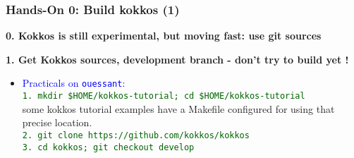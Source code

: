 \begin{frame}
  \frametitle{Hands-On 0: Build kokkos (1)}
  
  \textbf{0. Kokkos is still experimental, but moving fast: use git sources}
  
  \textbf{1. Get Kokkos sources, development branch - don't try to build yet !}
  \begin{itemize}
  \item \textcolor{blue}{Practicals on \texttt{ouessant}:}\\
    \textcolor{darkgreen}{\texttt{1. mkdir \$HOME/kokkos-tutorial; cd \$HOME/kokkos-tutorial}}\\
    some kokkos tutorial examples have a Makefile configured for using that precise location.\\
    \textcolor{darkgreen}{\texttt{2. git clone https://github.com/kokkos/kokkos}}\\
    \textcolor{darkgreen}{\texttt{3. cd kokkos; git checkout develop}}
  \end{itemize}
  
\end{frame}

